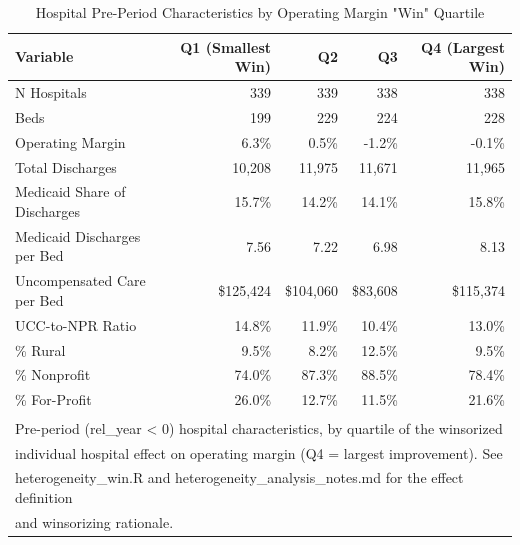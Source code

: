 \begin{table}[!h]
\centering
\caption{Hospital Pre-Period Characteristics by Operating Margin "Win" Quartile}
\centering
\begin{tabular}[t]{lrrrr}
\toprule
Variable & Q1 (Smallest Win) & Q2 & Q3 & Q4 (Largest Win)\\
\midrule
N Hospitals & 339 & 339 & 338 & 338\\
Beds & 199 & 229 & 224 & 228\\
Operating Margin & 6.3\% & 0.5\% & -1.2\% & -0.1\%\\
Total Discharges & 10,208 & 11,975 & 11,671 & 11,965\\
Medicaid Share of Discharges & 15.7\% & 14.2\% & 14.1\% & 15.8\%\\
\addlinespace
Medicaid Discharges per Bed & 7.56 & 7.22 & 6.98 & 8.13\\
Uncompensated Care per Bed & \$125,424 & \$104,060 & \$83,608 & \$115,374\\
UCC-to-NPR Ratio & 14.8\% & 11.9\% & 10.4\% & 13.0\%\\
\% Rural & 9.5\% & 8.2\% & 12.5\% & 9.5\%\\
\% Nonprofit & 74.0\% & 87.3\% & 88.5\% & 78.4\%\\
\addlinespace
\% For-Profit & 26.0\% & 12.7\% & 11.5\% & 21.6\%\\
\bottomrule
\multicolumn{5}{l}{\textsuperscript{} Pre-period (rel\_year < 0) hospital characteristics, by quartile of the winsorized}\\
\multicolumn{5}{l}{individual hospital effect on operating margin (Q4 = largest improvement). See}\\
\multicolumn{5}{l}{heterogeneity\_win.R and heterogeneity\_analysis\_notes.md for the effect definition}\\
\multicolumn{5}{l}{and winsorizing rationale.}\\
\end{tabular}
\end{table}
